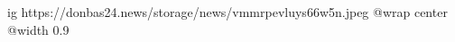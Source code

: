  
 
 
 
 

\ifcmt
  ig https://donbas24.news/storage/news/vmmrpevluys66w5n.jpeg
  @wrap center
  @width 0.9
\fi
